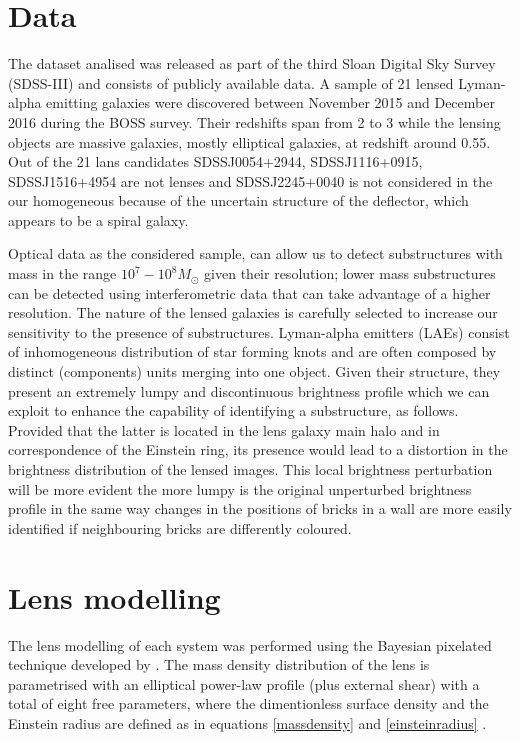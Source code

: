 \documentclass[a4paper,fleqn,usenatbib]{mnras}
\begin{document}
\section{Data}
The dataset analised was released as part of the third Sloan Digital Sky Survey (SDSS-III) and consists of publicly available data. A sample of 21 lensed Lyman-alpha emitting galaxies were discovered between November 2015 and December 2016 during the BOSS survey. Their redshifts span from 2 to 3 while the lensing objects are massive galaxies, mostly elliptical galaxies, at redshift around 0.55. Out of the 21 lans candidates SDSSJ0054+2944, SDSSJ1116+0915, SDSSJ1516+4954 are not lenses and SDSSJ2245+0040 is not considered in the our homogeneous because of the uncertain structure of the deflector, which appears to be a spiral galaxy.

Optical data as the considered sample, can allow us to detect substructures with mass in the range $10^7 - 10^8 M_{\odot}$ given their resolution; lower mass substructures can be detected using interferometric data that can take advantage of a higher resolution.
The nature of the lensed galaxies is carefully selected to increase our sensitivity to the presence of substructures. Lyman-alpha emitters (LAEs) consist of inhomogeneous distribution of star forming knots and are often composed by distinct (components) units merging into one object. Given their structure, they present an extremely lumpy and discontinuous brightness profile which we can exploit to enhance the capability of identifying a substructure, as follows. Provided that the latter is located in the lens galaxy main halo and in correspondence of the Einstein ring, its presence would lead to a distortion in the brightness distribution of the lensed images. This local brightness perturbation will be more evident the more lumpy is the original unperturbed brightness profile in the same way changes in the positions of bricks in a wall are more easily identified if neighbouring bricks are differently coloured.

\section{Lens modelling}
The lens modelling of each system was performed using the Bayesian pixelated technique developed by \citet{V09} \citep[see also][]{V14a}.
The mass density distribution of the lens is parametrised with an elliptical power-law profile (plus external shear) with a total of eight free parameters, where the dimentionless surface density and the Einstein radius are defined as in equations \ref{massdensity} and \ref{einsteinradius} \citep[see also][]{Vegetal14}.
\end{document}
